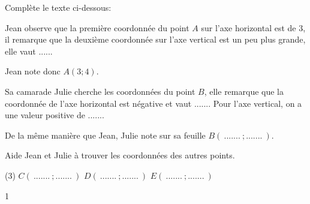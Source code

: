 \documentclass[a4paper,11pt]{report}
\begin{document}
\begin{exop}
{\begin{minipage}[t]{0.5\textwidth}
{}
\end{minipage}
\begin{minipage}[t]{0.5\textwidth}{
\vspace{0pt}
Complète le texte ci-dessous:

Jean observe que la première coordonnée du point $A$ sur l'axe horizontal est de 3, il remarque que la deuxième coordonnée sur l'axe vertical est un peu plus grande, elle vaut  ...... 

Jean note donc $A(3;4)$.
}
\end{minipage}

Sa camarade Julie cherche les coordonnées du point $B$, elle remarque que la coordonnée de l'axe horizontal est négative et vaut ....... 
Pour l'axe vertical, on a une valeur positive de .......

De la même manière que Jean, Julie note sur sa feuille $B(\ ....... \ ; ....... \ )$.

Aide Jean et Julie à trouver les coordonnées des autres points.

\begin{tasks}(3)
   \task $ C(\ ....... \ ; ....... \ )$
   \task  $ D(\ ....... \ ; ....... \ )$
   \task  $ E(\ ....... \ ; ....... \ )$
  \end{tasks}}
  {1}
\end{exop}
\end{document}
